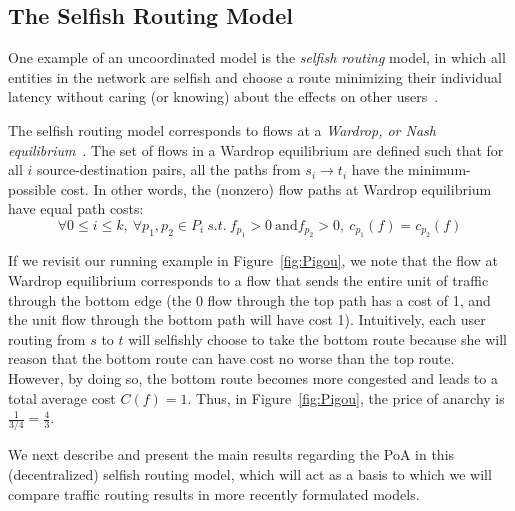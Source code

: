 \documentclass[acmlarge]{acmart}
\begin{document}
\subsection{The Selfish Routing Model}
One example of an uncoordinated model is the \emph{selfish routing} model, in which all entities in the network are selfish and choose a route minimizing their individual latency without caring (or knowing) about the effects on other users~\cite{tardos}.

The selfish routing model corresponds to flows at a \emph{Wardrop, or Nash equilibrium}~\cite{wardrop,haurie}.
The set of flows in a Wardrop equilibrium are defined such that for all $i$ source-destination pairs, all the paths from $s_i \to t_i$ have the minimum-possible cost. In other words, the (nonzero) 
flow paths at Wardrop equilibrium have equal path costs: 
$$\forall 0\le i \le k,~\forall p_1, p_2\in P_i~s.t.~f_{p_1} > 0~\text{and} f_{p_2} > 0,~ c_{p_1}(f) = c_{p_2}(f)$$

If we revisit our running example in Figure~\ref{fig:Pigou}, we note that the flow at Wardrop equilibrium corresponds to a flow that sends the entire unit of traffic through the bottom edge (the 0 flow through the top path has a cost of 1, and the unit flow through the bottom path will have cost 1).
Intuitively, each user routing from $s$ to $t$ will selfishly choose to take the bottom route because she will reason that the bottom route can have cost no worse than the top route. However, by doing so, the bottom route becomes more congested and leads to a total average cost $C(f) = 1$.
Thus, in Figure~\ref{fig:Pigou}, the price of anarchy is $\frac{1}{3/4} = \frac{4}{3}$.


We next describe and present the main results regarding the PoA in this (decentralized) selfish routing model, which will act as a basis to which we will compare traffic routing results in more recently formulated models.


\end{document}
